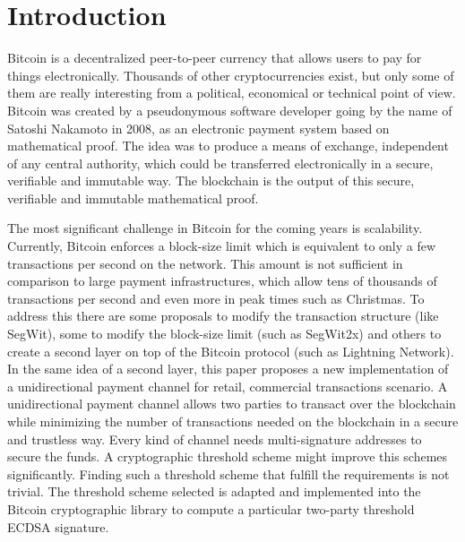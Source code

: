 \chapter{Introduction}
\label{chap:introduction}

Bitcoin is a decentralized peer-to-peer currency that allows users to pay for
things electronically. Thousands of other cryptocurrencies exist, but only some
of them are really interesting from a political, economical or technical point
of view. Bitcoin was created by a pseudonymous software developer going by the
name of Satoshi Nakamoto in 2008, as an electronic payment system based on
mathematical proof. The idea was to produce a means of exchange, independent of
any central authority, which could be transferred electronically in a secure,
verifiable and immutable way. The blockchain is the output of this secure,
verifiable and immutable mathematical proof.

The most significant challenge in Bitcoin for the coming years is scalability.
Currently, Bitcoin enforces a block-size limit which is equivalent to only a few
transactions per second on the network. This amount is not sufficient in
comparison to large payment infrastructures, which allow tens of thousands of
transactions per second and even more in peak times such as Christmas.  To
address this there are some proposals to modify the transaction structure (like
SegWit), some to modify the block-size limit (such as SegWit2x) and others to
create a second layer on top of the Bitcoin protocol (such as Lightning
Network). In the same idea of a second layer, this paper proposes a new
implementation of a unidirectional payment channel for retail, commercial
transactions scenario. A unidirectional payment channel allows two parties to
transact over the blockchain while minimizing the number of transactions needed
on the blockchain in a secure and trustless way. Every kind of channel needs
multi-signature addresses to secure the funds. A cryptographic threshold scheme
might improve this schemes significantly. Finding such a threshold scheme that
fulfill the requirements is not trivial. The threshold scheme selected is
adapted and implemented into the Bitcoin cryptographic library to compute a
particular two-party threshold ECDSA signature.

